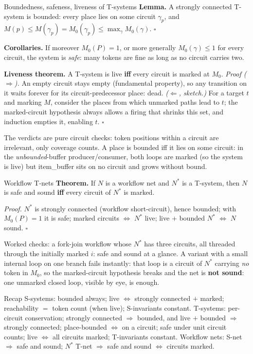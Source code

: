 \begin{notebox}{Boundedness, safeness, liveness of T-systems}
\textbf{Lemma.} A strongly connected T-system is bounded: every place lies on some circuit $\gamma_p$, and $M(p) \leq M(\gamma_p) = M_0(\gamma_p) \leq \max_\gamma M_0(\gamma)$. \hfill$\square$
\par\smallskip
\textbf{Corollaries.} If moreover $M_0(P) = 1$, or more generally $M_0(\gamma) \leq 1$ for every circuit, the system is \emph{safe}: many tokens are fine as long as no circuit carries two.
\par\smallskip
\textbf{Liveness theorem.} A T-system is live \textbf{iff} every circuit is marked at $M_0$.
\textit{Proof ($\Rightarrow$).} An empty circuit stays empty (fundamental property), so any transition on it waits forever for its circuit-predecessor place: dead. \textit{($\Leftarrow$, sketch.)} For a target $t$ and marking $M$, consider the places from which unmarked paths lead to $t$; the marked-circuit hypothesis always allows a firing that shrinks this set, and induction empties it, enabling $t$. \hfill$\square$
\par\smallskip
The verdicts are pure circuit checks: token positions within a circuit are irrelevant, only coverage counts. A place is bounded iff it lies on some circuit: in the \emph{unbounded}-buffer producer/consumer, both loops are marked (so the system is live) but \textsf{item\_buffer} sits on no circuit and grows without bound.
\end{notebox}

\begin{notebox}{Workflow T-nets}
\textbf{Theorem.} If $N$ is a workflow net and $N^*$ is a T-system, then $N$ is safe and sound \textbf{iff} every circuit of $N^*$ is marked.
\par\smallskip
\textit{Proof.} $N^*$ is strongly connected (workflow short-circuit), hence bounded; with $M_0(P) = 1$ it is safe; marked circuits $\iff$ $N^*$ live; live $+$ bounded $N^*$ $\iff$ $N$ sound. \hfill$\square$
\par\smallskip
Worked checks: a fork-join workflow whose $N^*$ has three circuits, all threaded through the initially marked $i$: safe and sound at a glance. A variant with a small internal loop on one branch fails instantly: that loop is a circuit of $N^*$ carrying \emph{no} token in $M_0$, so the marked-circuit hypothesis breaks and the net is \textbf{not sound}: one unmarked closed loop, visible by eye, is enough.
\end{notebox}

\begin{notebox}{Recap}
S-systems: bounded always; live $\iff$ strongly connected $+$ marked; reachability $=$ token count (when live); S-invariants constant. T-systems: per-circuit conservation; strongly connected $\Rightarrow$ bounded, and live $+$ bounded $\Rightarrow$ strongly connected; place-bounded $\iff$ on a circuit; safe under unit circuit counts; live $\iff$ all circuits marked; T-invariants constant. Workflow nets: S-net $\Rightarrow$ safe and sound; $N^*$ T-net $\Rightarrow$ safe and sound $\iff$ circuits marked.
\end{notebox}
